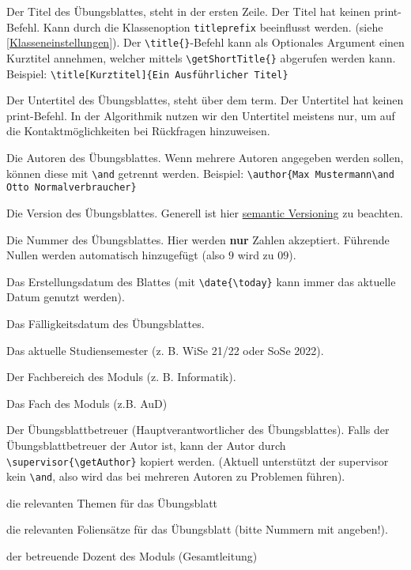 \documentclass[
    titleprefix=AlgoTeX,
    inlineshortcut=java,
    corporatedesign,
    boxarc,
]{algoexercise}
\renewcommand*{\author}[1]{
    \seq_gset_split:Nnn \g_ptxcd_author_seq {\and} {#1}
    \seq_if_empty:NF \g_ptxcd_author_seq {\tl_gset:Nn \printAuthor {\int_compare:nTF{\seq_count:N \g_ptxcd_author_seq >
                1}{Autoren}{Autor}:~\hfill\seq_use:Nnnn \g_ptxcd_author_seq {~\authorandname{}~} {,~} {~\authorandname{}~}\par}}
}
\begin{document}
    \begin{description}[leftmargin=2.5cm,itemsep=-.5ex]
        \item[title] \sloppy{}Der Titel
            des Übungsblattes, steht in der ersten Zeile.
            Der Titel hat keinen print-Befehl.
            Kann durch die Klassenoption \verb+titleprefix+ beeinflusst werden.
            (siehe \ref{Klasseneinstellungen}).
            Der \verb+\title{}+-Befehl kann als Optionales Argument einen Kurztitel annehmen, welcher mittels \verb+\getShortTitle{}+
            abgerufen werden kann.
            Beispiel: \verb+\title[Kurztitel]{Ein Ausführlicher Titel}+
        \item[subtitle] Der Untertitel des Übungsblattes, steht über dem
            term.
            Der Untertitel hat keinen print-Befehl.
            In der Algorithmik nutzen wir den Untertitel meistens nur, um auf die Kontaktmöglichkeiten bei Rückfragen hinzuweisen.
        \item[author] Die Autoren des Übungsblattes.
            Wenn mehrere Autoren angegeben werden sollen, können diese mit \verb+\and+ getrennt werden.
            Beispiel: \verb+\author{Max Mustermann\and Otto Normalverbraucher}+
        \item[version] Die Version des Übungsblattes.
            Generell ist hier \href{https://semver.org/lang/de/}{semantic Versioning} zu beachten.
        \item[sheetnumber] Die Nummer des Übungsblattes.
            Hier werden \textbf{nur} Zahlen akzeptiert.
            Führende Nullen werden automatisch hinzugefügt (also $9$ wird zu $09$).
        \item[date] Das Erstellungsdatum des Blattes (mit \verb+\date{\today}+ kann immer das aktuelle Datum genutzt werden).
        \item[duedate] Das Fälligkeitsdatum des Übungsblattes.
        \item[semester] Das aktuelle Studiensemester (z.
            B.
            WiSe 21/22 oder SoSe 2022).
        \item[fachbereich] Der Fachbereich des Moduls (z.
            B.
            Informatik).
        \item [fach] Das Fach des Moduls (z.B. AuD)
        \item[supervisor] Der Übungsblattbetreuer (Hauptverantwortlicher des Übungsblattes).
            Falls der Übungsblattbetreuer der Autor ist, kann der Autor durch \verb+\supervisor{\getAuthor}+ kopiert werden.
            (Aktuell unterstützt der supervisor kein \verb+\and+,
            also wird das bei mehreren Autoren zu Problemen führen).
        \item[topics] die relevanten Themen für das Übungsblatt
        \item[slides] die relevanten Foliensätze für das Übungsblatt (bitte Nummern mit angeben!).
        \item[dozent] der betreuende Dozent des Moduls (Gesamtleitung)
    \end{description}
    \clearpage
\end{document}
